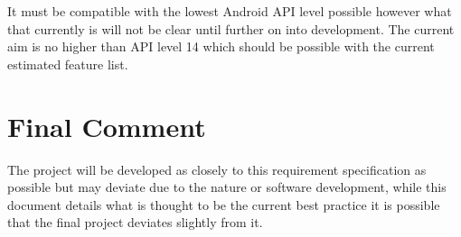 \documentclass[10pt,a4paper]{article}
\begin{document}
It must be compatible with the lowest Android API level possible however what that currently is will not be clear until further on into development. The current aim is no higher than API level 14 which should be possible with the current estimated feature list.

\section{Final Comment}
The project will be developed as closely to this requirement specification as possible but may deviate due to the nature or software development, while this document details what is thought to be the current best practice it is possible that the final project deviates slightly from it. 
\end{document}
